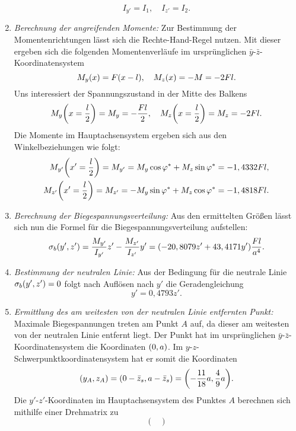 \documentclass{exercise}
\begin{document}
\begin{enumerate}[label=\arabic*)]
        \[
            I_{y'} = I_1, \quad I_{z'} = I_2.
        \]
        \item \emph{Berechnung der angreifenden Momente:} Zur Bestimmung der Momentenrichtungen lässt sich die Rechte-Hand-Regel nutzen.
        Mit dieser ergeben sich die folgenden Momentenverläufe im ursprünglichen \(\bar{y}\)-\(\bar{z}\)-Koordinatensystem
        \[
            M_y\parentheses*{x} = F\parentheses*{x - l}, \quad M_z\parentheses*{x} = -M = -2Fl.
        \]
        Uns interessiert der Spannungszustand in der Mitte des Balkens
        \[
            M_y\parentheses*{x = \frac{l}{2}} = M_y = -\frac{Fl}{2}, \quad M_z\parentheses*{x = \frac{l}{2}} = M_z = -2Fl.
        \]
        Die Momente im Hauptachsensystem ergeben sich aus den Winkelbeziehungen wie folgt:
        \begin{align*}
            M_{y'}\parentheses*{x' = \frac{l}{2}} = M_{y'} = M_y\cos\varphi^* + M_z\sin\varphi^* = -1,4332Fl,\\
            M_{z'}\parentheses*{x' = \frac{l}{2}} = M_{z'} = -M_y\sin\varphi^* + M_z\cos\varphi^* = -1,4818Fl.
        \end{align*}
        \item \emph{Berechnung der Biegespannungsverteilung:} Aus den ermittelten Größen lässt sich nun die Formel für die Biegespannungsverteilung aufstellen:
        \[
            \sigma_b\parentheses*{y', z'} = \frac{M_{y'}}{I_{y'}}z' - \frac{M_{z'}}{I_{z'}}y' = \parentheses*{-20,8079z' + 43,4171y'}\frac{Fl}{a^4}.
        \]
        \item \emph{Bestimmung der neutralen Linie:} Aus der Bedingung für die neutrale Linie \(\sigma_b\parentheses*{y', z'} = 0\) folgt nach Auflösen nach \(y'\) die Geradengleichung
        \[
            y' = 0,4793z'.
        \]
        \item \emph{Ermittlung des am weitesten von der neutralen Linie entfernten Punkt:} Maximale Biegespannungen treten am Punkt \(A\) auf, da dieser am weitesten von der neutralen Linie entfernt liegt.
        Der Punkt hat im ursprünglichen \(\bar{y}\)-\(\bar{z}\)-Koordinatensystem die Koordinaten \(\parentheses*{0, a}\).
        Im \(y\)-\(z\)-Schwerpunktkoordinatensystem hat er somit die Koordinaten
        \[
            \parentheses*{y_A, z_A} = \parentheses*{0 - \bar{z}_s, a - \bar{z}_s} = \parentheses*{-\frac{11}{18}a, \frac{4}{9}a}.
        \]
        Die \(y'\)-\(z'\)-Koordinaten im Hauptachsensystem des Punktes \(A\) berechnen sich mithilfe einer Drehmatrix zu
        \[
            \begin{pmatrix}

\end{pmatrix}\]
\end{enumerate}
\end{document}
